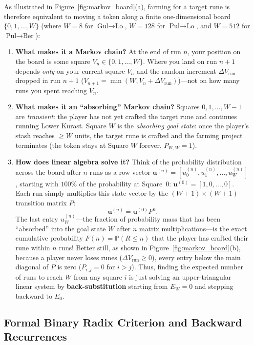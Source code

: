 \documentclass[11pt,reqno]{amsart}
\theoremstyle{definition}
\begin{document}
As illustrated in Figure~\ref{fig:markov_board}(a), farming for a target rune is therefore equivalent to moving a token along a finite one-dimensional board $\{0, 1, \dots, W\}$ (where $W = 8$ for $\text{Gul}\to\text{Lo}$, $W = 128$ for $\text{Pul}\to\text{Lo}$, and $W = 512$ for $\text{Pul}\to\text{Ber}$):
\begin{enumerate}
    \item \textbf{What makes it a Markov chain?} At the end of run $n$, your position on the board is some square $V_n \in \{0, 1, \dots, W\}$. Where you land on run $n+1$ depends \emph{only} on your current square $V_n$ and the random increment $\Delta V_{\text{run}}$ dropped in run $n+1$ ($V_{n+1} = \min(W, V_n + \Delta V_{\text{run}})$)—not on how many runs you spent reaching $V_n$.
    \item \textbf{What makes it an ``absorbing'' Markov chain?} Squares $0, 1, \dots, W-1$ are \emph{transient}: the player has not yet crafted the target rune and continues running Lower Kurast. Square $W$ is the \emph{absorbing goal state}: once the player's stash reaches $\ge W$ units, the target rune is crafted and the farming project terminates (the token stays at Square $W$ forever, $P_{W,W} = 1$).
    \item \textbf{How does linear algebra solve it?} Think of the probability distribution across the board after $n$ runs as a row vector $\mathbf{u}^{(n)} = [u_0^{(n)}, u_1^{(n)}, \dots, u_W^{(n)}]$, starting with $100\%$ of the probability at Square~$0$: $\mathbf{u}^{(0)} = [1, 0, \dots, 0]$. Each run simply multiplies this state vector by the $(W+1) \times (W+1)$ transition matrix $P$:
    \[
        \mathbf{u}^{(n)} = \mathbf{u}^{(0)} P^n.
    \]
    The last entry $u_W^{(n)}$—the fraction of probability mass that has been ``absorbed'' into the goal state $W$ after $n$ matrix multiplications—is the exact cumulative probability $F(n) = \mathbb{P}(R \le n)$ that the player has crafted their rune within $n$ runs! Better still, as shown in Figure~\ref{fig:markov_board}(b), because a player never loses runes ($\Delta V_{\text{run}} \ge 0$), every entry below the main diagonal of $P$ is zero ($P_{i,j} = 0$ for $i > j$). Thus, finding the expected number of runs to reach $W$ from any square $i$ is just solving an upper-triangular linear system by \textbf{back-substitution} starting from $E_W = 0$ and stepping backward to $E_0$.
\end{enumerate}

\subsection{Formal Binary Radix Criterion and Backward Recurrences}
\end{document}
